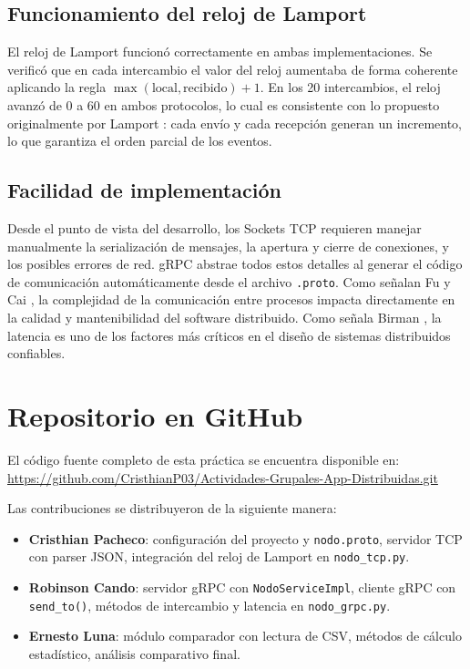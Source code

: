 \documentclass[12pt,a4paper]{article}
\begin{document}
\subsection{Funcionamiento del reloj de Lamport}

El reloj de Lamport funcionó correctamente en ambas implementaciones. Se verificó que en cada intercambio el valor del reloj aumentaba de forma coherente aplicando la regla \(\max(\text{local}, \text{recibido}) + 1\). En los 20 intercambios, el reloj avanzó de 0 a 60 en ambos protocolos, lo cual es consistente con lo propuesto originalmente por Lamport \cite{lamport1978}: cada envío y cada recepción generan un incremento, lo que garantiza el orden parcial de los eventos.

\subsection{Facilidad de implementación}

Desde el punto de vista del desarrollo, los Sockets TCP requieren manejar manualmente la serialización de mensajes, la apertura y cierre de conexiones, y los posibles errores de red. gRPC abstrae todos estos detalles al generar el código de comunicación automáticamente desde el archivo \texttt{.proto}. Como señalan Fu y Cai \cite{fu2019}, la complejidad de la comunicación entre procesos impacta directamente en la calidad y mantenibilidad del software distribuido. Como señala Birman \cite{birman2012}, la latencia es uno de los factores más críticos en el diseño de sistemas distribuidos confiables.


\section{Repositorio en GitHub}

El código fuente completo de esta práctica se encuentra disponible en:
 \url{https://github.com/CristhianP03/Actividades-Grupales-App-Distribuidas.git}

\vspace{0.25cm}
Las contribuciones se distribuyeron de la siguiente manera:

\begin{itemize}[leftmargin=2cm]
    \item \textbf{Cristhian Pacheco}: configuración del proyecto y \texttt{nodo.proto}, servidor TCP con parser JSON, integración del reloj de Lamport en \texttt{nodo\_tcp.py}.
    \item \textbf{Robinson Cando}: servidor gRPC con \texttt{NodoServiceImpl}, cliente gRPC con \texttt{send\_to()}, métodos de intercambio y latencia en \texttt{nodo\_grpc.py}.
    \item \textbf{Ernesto Luna}: módulo comparador con lectura de CSV, métodos de cálculo estadístico, análisis comparativo final.
\end{itemize}
\end{document}
